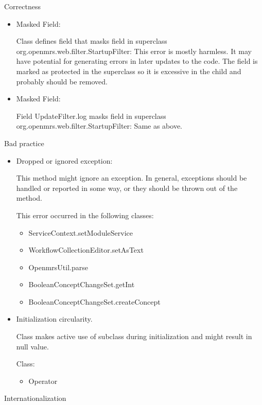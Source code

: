 \documentclass{article}
\begin{document}
Correctness
  \begin{itemize}
    \item Masked Field:

    Class defines field that masks field in superclass
    org.openmrs.web.filter.StartupFilter:
    This error is mostly harmless. It may have potential for generating
    errors in later updates to the code. The field is marked as
    protected in the superclass so it is excessive in the child and
    probably should be removed.

    \item Masked Field:

    Field UpdateFilter.log masks field in superclass
    org.openmrs.web.filter.StartupFilter:
    Same as above.
  \end{itemize}
Bad practice
  \begin{itemize}
    \item Dropped or ignored exception:

      This method might ignore an exception. In general, exceptions
      should be handled or reported in some way, or they should be thrown
      out of the method.

      This error occurred in the following classes:

      \begin{itemize}
        \item ServiceContext.setModuleService
        \item WorkflowCollectionEditor.setAsText
        \item OpenmrsUtil.parse
        \item BooleanConceptChangeSet.getInt
        \item BooleanConceptChangeSet.createConcept
      \end{itemize}
    \item Initialization circularity. 

      Class makes active use of subclass during initialization and might
      result in null value.

      Class:

      \begin{itemize}
        \item Operator 
      \end{itemize}
  \end{itemize}
Internationalization 
\end{document}
